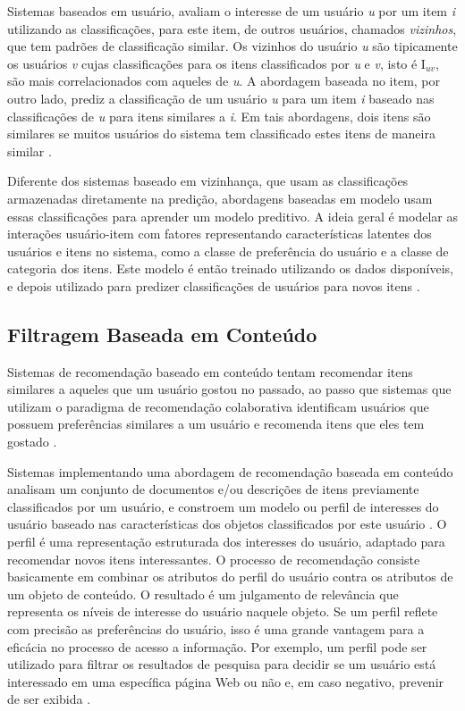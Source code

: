 Sistemas baseados em usuário, avaliam o interesse de um usuário \textit{u} por um item \textit{i} utilizando as classificações, para este item, de outros usuários, chamados \textit{vizinhos}, que tem padrões de classificação similar. Os vizinhos do usuário \textit{u} são tipicamente os usuários \textit{v} cujas classificações para os itens classificados por \textit{u} e \textit{v}, isto é I{$_{uv}$}, são mais correlacionados com aqueles de \textit{u}. A abordagem baseada no item, por outro lado, prediz a classificação de um usuário \textit{u} para um item \textit{i} baseado nas classificações de \textit{u} para itens similares a \textit{i}. Em tais abordagens, dois itens são similares se muitos usuários do sistema tem classificado estes itens de maneira similar \citep{Ricci:2010:RSH:1941884}.

Diferente dos sistemas baseado em vizinhança, que usam as classificações armazenadas diretamente na predição, abordagens baseadas em modelo usam essas classificações para aprender um modelo preditivo. A ideia geral é modelar as interações usuário-item com fatores representando características latentes dos usuários e itens no sistema, como a classe de preferência do usuário e a classe de categoria dos itens. Este modelo é então treinado utilizando os dados disponíveis, e depois utilizado para predizer classificações de usuários para novos itens \citep{Ricci:2010:RSH:1941884}.

\subsection{Filtragem Baseada em Conteúdo}
\label{subsec:contextFilterRecSys}

Sistemas de recomendação baseado em conteúdo tentam recomendar itens similares a aqueles que um usuário gostou no passado, ao passo que sistemas que utilizam o paradigma de recomendação colaborativa identificam usuários que possuem preferências similares a um usuário e recomenda itens que eles tem gostado \citep{Lops2011}.

Sistemas implementando uma abordagem de recomendação baseada em conteúdo analisam um conjunto de documentos e/ou descrições de itens previamente classificados por um usuário, e constroem um modelo ou perfil de interesses do usuário baseado nas características dos objetos classificados por este usuário \citep{784084}. O perfil é uma representação estruturada dos interesses do usuário, adaptado para recomendar novos itens interessantes. O processo de recomendação consiste basicamente em combinar os atributos do perfil do usuário contra os atributos de um objeto de conteúdo. O resultado é um julgamento de relevância que representa os níveis de interesse do usuário naquele objeto. Se um perfil reflete com precisão as preferências do usuário, isso é uma grande vantagem para a eficácia no processo de acesso a informação. Por exemplo, um perfil pode ser utilizado para filtrar os resultados de pesquisa para decidir se um usuário está interessado em uma específica página Web ou não e, em caso negativo, prevenir de ser exibida \citep{Lops2011}.

